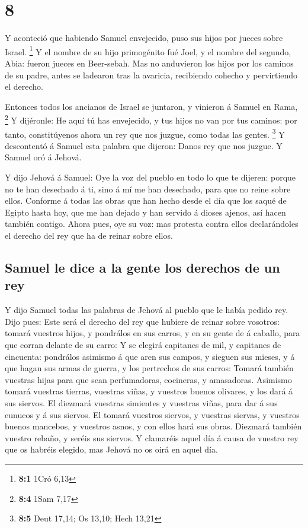 \hypertarget{section-7}{%
\section{8}\label{section-7}}

 Y aconteció que habiendo Samuel envejecido, puso sus
hijos por jueces sobre Israel. \footnote{\textbf{8:1} 1Cró 6,13}
 Y el nombre de su hijo primogénito fué Joel, y el nombre
del segundo, Abia: fueron jueces en Beer-sebah.  Mas no
anduvieron los hijos por los caminos de su padre, antes se ladearon tras
la avaricia, recibiendo cohecho y pervirtiendo el derecho.

 Entonces todos los ancianos de Israel se juntaron, y
vinieron á Samuel en Rama, \footnote{\textbf{8:4} 1Sam 7,17}
 Y dijéronle: He aquí tú has envejecido, y tus hijos no
van por tus caminos: por tanto, constitúyenos ahora un rey que nos
juzgue, como todas las gentes. \footnote{\textbf{8:5} Deut 17,14; Os
  13,10; Hech 13,21}  Y descontentó á Samuel esta palabra
que dijeron: Danos rey que nos juzgue. Y Samuel oró á Jehová.

 Y dijo Jehová á Samuel: Oye la voz del pueblo en todo lo
que te dijeren: porque no te han desechado á ti, sino á mí me han
desechado, para que no reine sobre ellos.  Conforme á
todas las obras que han hecho desde el día que los saqué de Egipto hasta
hoy, que me han dejado y han servido á dioses ajenos, así hacen también
contigo.  Ahora pues, oye su voz: mas protesta contra
ellos declarándoles el derecho del rey que ha de reinar sobre ellos.

\hypertarget{samuel-le-dice-a-la-gente-los-derechos-de-un-rey}{%
\subsection{Samuel le dice a la gente los derechos de un
rey}\label{samuel-le-dice-a-la-gente-los-derechos-de-un-rey}}

 Y dijo Samuel todas las palabras de Jehová al pueblo que
le había pedido rey.  Dijo pues: Este será el derecho del
rey que hubiere de reinar sobre vosotros: tomará vuestros hijos, y
pondrálos en sus carros, y en su gente de á caballo, para que corran
delante de su carro:  Y se elegirá capitanes de mil, y
capitanes de cincuenta: pondrálos asimismo á que aren sus campos, y
sieguen sus mieses, y á que hagan sus armas de guerra, y los pertrechos
de sus carros:  Tomará también vuestras hijas para que
sean perfumadoras, cocineras, y amasadoras.  Asimismo
tomará vuestras tierras, vuestras viñas, y vuestros buenos olivares, y
los dará á sus siervos.  El diezmará vuestras simientes y
vuestras viñas, para dar á sus eunucos y á sus siervos. 
El tomará vuestros siervos, y vuestras siervas, y vuestros buenos
mancebos, y vuestros asnos, y con ellos hará sus obras. 
Diezmará también vuestro rebaño, y seréis sus siervos.  Y
clamaréis aquel día á causa de vuestro rey que os habréis elegido, mas
Jehová no os oirá en aquel día.

